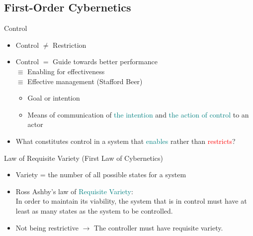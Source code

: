 \documentclass[
	11pt,
	aspectratio=169,
]{beamer}
\begin{document}
        \subsection{First-Order Cybernetics}
            \begin{frame}{Control}
                \begin{itemize}
                    \item<1-> Control $\neq$ Restriction
                    \item<2-> Control $=$ Guide towards better performance\\
                    $\equiv$ Enabling for effectiveness\\
                    $\equiv$ Effective management (Stafford Beer)
                    \begin{itemize}
                        \item Goal or intention
                        \item Means of communication of \textcolor{teal}{the intention} and \textcolor{teal}{the action of control} to an actor
                    \end{itemize}
                    \item<3-> What constitutes control in a system that \textcolor{teal}{enables} rather than \textcolor{red}{restricts}?
                \end{itemize}
            \end{frame}
            \begin{frame}{Law of Requisite Variety (First Law of Cybernetics)}
                \begin{itemize}
                    \item<1-> Variety = the number of all possible states for a system
                    \item<2-> Ross Ashby's law of \textcolor{teal}{Requisite Variety}: \\
                        In order to maintain its viability, the system that is in control must have at least as many states as the system to be controlled.
                    \item<3-> Not being restrictive $\longrightarrow$ The controller must have requisite variety.
                \end{itemize}
            \end{frame}
\end{document}
